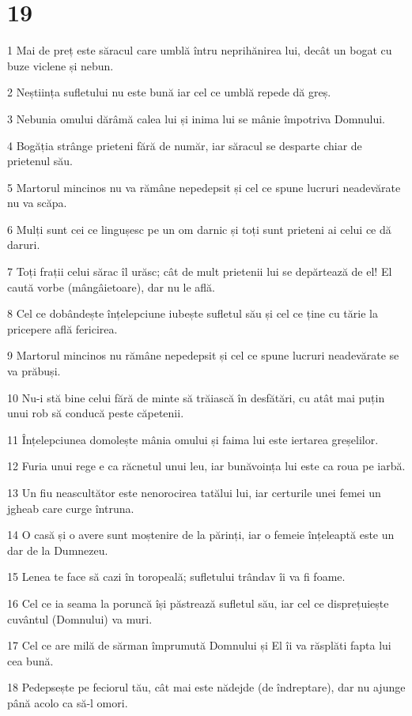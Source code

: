 \chapter{19}

\par 1 Mai de preț este săracul care umblă întru neprihănirea lui, decât un bogat cu buze viclene și nebun.
\par 2 Neștiința sufletului nu este bună iar cel ce umblă repede dă greș.
\par 3 Nebunia omului dărâmă calea lui și inima lui se mânie împotriva Domnului.
\par 4 Bogăția strânge prieteni fără de număr, iar săracul se desparte chiar de prietenul său.
\par 5 Martorul mincinos nu va rămâne nepedepsit și cel ce spune lucruri neadevărate nu va scăpa.
\par 6 Mulți sunt cei ce lingușesc pe un om darnic și toți sunt prieteni ai celui ce dă daruri.
\par 7 Toți frații celui sărac îl urăsc; cât de mult prietenii lui se depărtează de el! El caută vorbe (mângâietoare), dar nu le află.
\par 8 Cel ce dobândește înțelepciune iubește sufletul său și cel ce ține cu tărie la pricepere află fericirea.
\par 9 Martorul mincinos nu rămâne nepedepsit și cel ce spune lucruri neadevărate se va prăbuși.
\par 10 Nu-i stă bine celui fără de minte să trăiască în desfătări, cu atât mai puțin unui rob să conducă peste căpetenii.
\par 11 Înțelepciunea domolește mânia omului și faima lui este iertarea greșelilor.
\par 12 Furia unui rege e ca răcnetul unui leu, iar bunăvoința lui este ca roua pe iarbă.
\par 13 Un fiu neascultător este nenorocirea tatălui lui, iar certurile unei femei un jgheab care curge întruna.
\par 14 O casă și o avere sunt moștenire de la părinți, iar o femeie înțeleaptă este un dar de la Dumnezeu.
\par 15 Lenea te face să cazi în toropeală; sufletului trândav îi va fi foame.
\par 16 Cel ce ia seama la poruncă își păstrează sufletul său, iar cel ce disprețuiește cuvântul (Domnului) va muri.
\par 17 Cel ce are milă de sărman împrumută Domnului și El îi va răsplăti fapta lui cea bună.
\par 18 Pedepsește pe feciorul tău, cât mai este nădejde (de îndreptare), dar nu ajunge până acolo ca să-l omori.
